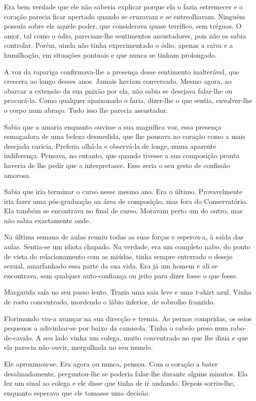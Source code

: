 Era bem verdade que ele não saberia explicar porque ela o fazia
estremecer e o coração parecia ficar apertado quando se cruzavam e se
entreolhavam. Ninguém possuía sobre ele aquele poder, que considerava
quase terrífico, sem tréguas. O amor, tal como o ódio, pareciam-lhe
sentimentos assustadores, pois não os sabia controlar. Porém, ainda não
tinha experimentado o ódio, apenas a raiva e a humilhação, em situações
pontuais e que nunca se tinham prolongado.

A voz da rapariga confirmava-lhe a presença desse sentimento
inalterável, que crescera ao longo desses anos. Jamais haviam
conversado. Mesmo agora, ao abarcar a extensão da sua paixão por ela,
não sabia se desejava falar-lhe ou procurá-la. Como qualquer apaixonado
o faria, dizer-lhe o que sentia, envolver-lhe o corpo num abraço. Tudo
isso lhe parecia assustador.

Sabia que a amaria enquanto ouvisse a sua magnífica voz, essa presença
esmagadora de uma beleza desmedida, que lhe pousava no coração como a
mais desejada carícia. Preferia olhá-la e observá-la de longe, numa
aparente indiferença. Pensava, no entanto, que quando tivesse a sua
composição pronta haveria de lhe pedir que a interpretasse. Esse seria o
seu gesto de confissão amorosa.

Sabia que iria terminar o curso nesse mesmo ano. Era o último.
Provavelmente iria fazer uma pós-graduação na área de composição, mas
fora do Conservatório. Ela também se encontrava no final de curso.
Moravam perto um do outro, mas não sabia exactamente onde.

Na última semana de aulas reuniu todas as suas forças e esperou-a, à
saída das aulas. Sentia-se um idiota chapado. Na verdade, era um
completo nabo, do ponto de vista do relacionamento com as miúdas, tinha
sempre enterrado o desejo sexual, amarfanhado essa parte da sua vida.
Era já um homem e ali se encontrava, sem qualquer auto-confiança ou
jeito para dizer fosse o que fosse.

Margarida saía no seu passo lento. Trazia uma saia leve e uma t-shirt
azul. Vinha de rosto concentrado, mordendo o lábio inferior, de sobrolho
franzido.

Florimundo viu-a avançar na sua direcção e tremia. As pernas compridas,
os seios pequenos a adivinhar-se por baixo da camisola. Tinha o cabelo
preso num rabo-de-cavalo. A seu lado vinha um colega, muito concentrado
no que lhe dizia e que ela parecia não ouvir, mergulhada no seu mundo.

Ele aproximou-se. Era agora ou nunca, pensou. Com o coração a bater
desalmadamente, perguntou-lhe se poderia falar-lhe durante alguns
minutos. Ela fez um sinal ao colega e ele disse que tinha de ir andando.
Depois sorriu-lhe, enquanto esperava que ele tomasse uma decisão.

